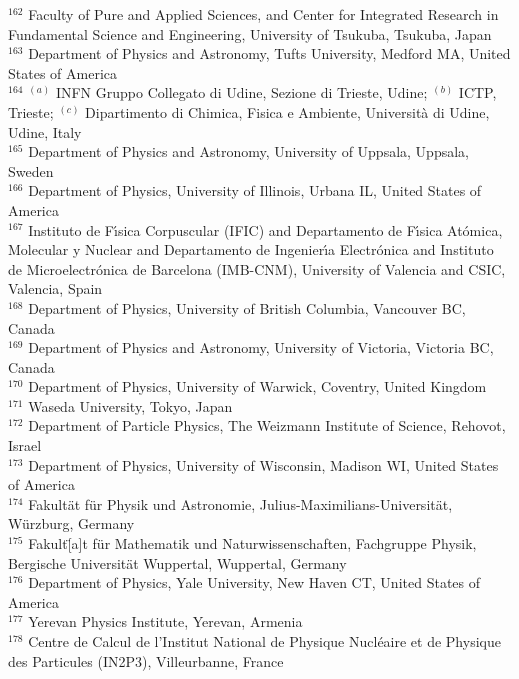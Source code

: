 \begin{flushleft}
$^{162}$ Faculty of Pure and Applied Sciences, and Center for Integrated Research in Fundamental Science and Engineering, University of Tsukuba, Tsukuba, Japan\\
$^{163}$ Department of Physics and Astronomy, Tufts University, Medford MA, United States of America\\
$^{164}$ $^{(a)}$ INFN Gruppo Collegato di Udine, Sezione di Trieste, Udine; $^{(b)}$ ICTP, Trieste; $^{(c)}$ Dipartimento di Chimica, Fisica e Ambiente, Universit{\`a} di Udine, Udine, Italy\\
$^{165}$ Department of Physics and Astronomy, University of Uppsala, Uppsala, Sweden\\
$^{166}$ Department of Physics, University of Illinois, Urbana IL, United States of America\\
$^{167}$ Instituto de F{\'\i}sica Corpuscular (IFIC) and Departamento de F{\'\i}sica At{\'o}mica, Molecular y Nuclear and Departamento de Ingenier{\'\i}a Electr{\'o}nica and Instituto de Microelectr{\'o}nica de Barcelona (IMB-CNM), University of Valencia and CSIC, Valencia, Spain\\
$^{168}$ Department of Physics, University of British Columbia, Vancouver BC, Canada\\
$^{169}$ Department of Physics and Astronomy, University of Victoria, Victoria BC, Canada\\
$^{170}$ Department of Physics, University of Warwick, Coventry, United Kingdom\\
$^{171}$ Waseda University, Tokyo, Japan\\
$^{172}$ Department of Particle Physics, The Weizmann Institute of Science, Rehovot, Israel\\
$^{173}$ Department of Physics, University of Wisconsin, Madison WI, United States of America\\
$^{174}$ Fakult{\"a}t f{\"u}r Physik und Astronomie, Julius-Maximilians-Universit{\"a}t, W{\"u}rzburg, Germany\\
$^{175}$ Fakult\"[a]t f{\"u}r Mathematik und Naturwissenschaften, Fachgruppe Physik, Bergische Universit{\"a}t Wuppertal, Wuppertal, Germany\\
$^{176}$ Department of Physics, Yale University, New Haven CT, United States of America\\
$^{177}$ Yerevan Physics Institute, Yerevan, Armenia\\
$^{178}$ Centre de Calcul de l'Institut National de Physique Nucl{\'e}aire et de Physique des Particules (IN2P3), Villeurbanne, France\\

\end{flushleft}
